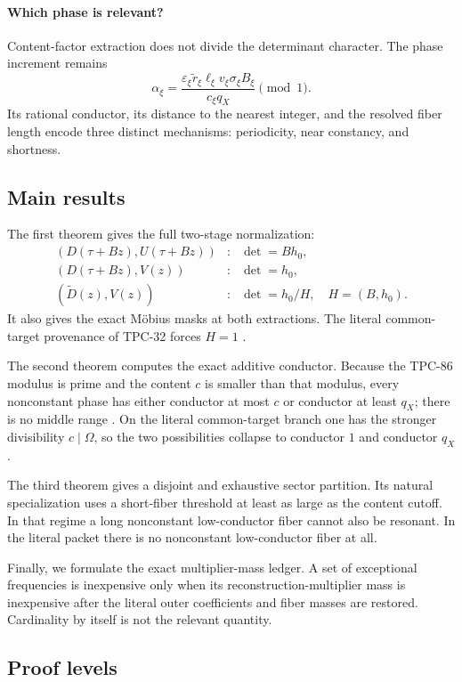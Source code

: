 \paragraph{Which phase is relevant?}
Content-factor extraction does not divide the determinant character.
The phase increment remains
\[
 \alpha_\xi
 =
 \frac{\varepsilon_\xi\widetilde r_\xi
 \ell_\xi v_\xi\sigma_\xi B_\xi}
 {c_\xi q_X}
 \pmod 1.
\]
Its rational conductor, its distance to the nearest integer, and
the resolved fiber length encode three distinct mechanisms:
periodicity, near constancy, and shortness.

\subsection{Main results}

The first theorem gives the full two-stage normalization:
\[
\begin{array}{ccl}
(D(\tau+Bz),U(\tau+Bz))
&:&\det=Bh_0,\\
(D(\tau+Bz),V(z))
&:&\det=h_0,\\
(\widetilde D(z),V(z))
&:&\det=h_0/H,\quad H=(B,h_0).
\end{array}
\]
It also gives the exact M\"obius masks at both extractions.  The
literal common-target provenance of TPC-32 forces \(H=1\)
\citep{WangTPC32}.

The second theorem computes the exact additive conductor.  Because
the TPC-86 modulus is prime and the content \(c\) is smaller than
that modulus, every nonconstant phase has either conductor at most
\(c\) or conductor at least \(q_X\); there is no middle range
\citep{WangTPC86}.  On the literal common-target branch one has the
stronger divisibility \(c\mid\Omega\), so the two possibilities
collapse to conductor \(1\) and conductor \(q_X\).

The third theorem gives a disjoint and exhaustive sector partition.
Its natural specialization uses a short-fiber threshold at least as
large as the content cutoff.  In that regime a long nonconstant
low-conductor fiber cannot also be resonant.  In the literal packet
there is no nonconstant low-conductor fiber at all.

Finally, we formulate the exact multiplier-mass ledger.  A set of
exceptional frequencies is inexpensive only when its
reconstruction-multiplier mass is inexpensive after the literal
outer coefficients and fiber masses are restored.  Cardinality by
itself is not the relevant quantity.

\subsection{Proof levels}

